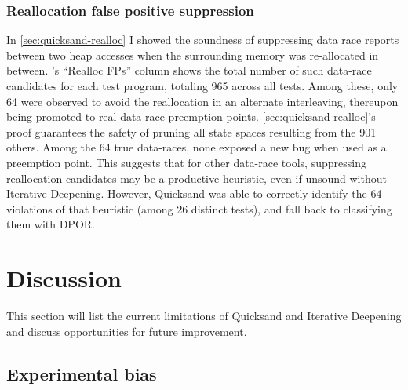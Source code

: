 \subsubsection{Reallocation false positive suppression}

In \cref{sec:quicksand-realloc} I showed the soundness of
suppressing data race reports between two heap accesses when the surrounding memory was re-allocated in between.
's ``Realloc FPs'' column shows the total number of such data-race candidates for each test program,
totaling 965 across all tests.
Among these, only 64 were observed to avoid the reallocation in an alternate interleaving,
thereupon being promoted to real data-race preemption points.
\cref{sec:quicksand-realloc}'s proof guarantees the safety of pruning all state spaces resulting from the 901 others.
%
Among the 64 true data-races, %
none exposed a new bug when used as a preemption point.
This suggests that for other data-race tools,
suppressing reallocation candidates may be a productive heuristic,
even if unsound without Iterative Deepening.
However, Quicksand was able to correctly identify the 64 violations of that heuristic (among 26 distinct tests),
and fall back to classifying them with DPOR.


\section{Discussion}
\label{sec:quicksand-discussion}

This section will list the current limitations of Quicksand and Iterative Deepening
and discuss opportunities for future improvement.

\subsection{Experimental bias}

